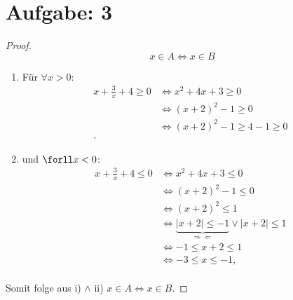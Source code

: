 \documentclass{exam}
\begin{document}
\pagebreak

\section*{Aufgabe: 3}
\begin{proof}
	\begin{displaymath}
		x \in A  \Leftrightarrow x \in B
	\end{displaymath}
	\begin{enumerate}[label=\roman*)]
		\item 	Für $\forall x > 0$: \begin{align*}
			      x + \frac{3}{x} + 4 \ge 0 & \Leftrightarrow x^2 +  4x + 3 \ge 0             \\
			                                & \Leftrightarrow {(x + 2)}^2  - 1 \ge 0          \\
			                                & \Leftrightarrow {(x + 2)}^2  - 1 \ge 4 -1 \ge 0 \\,
		      \end{align*}

		\item 	und $\forll x < 0$: \begin{align*}
			      x + \frac{3}{x} + 4 \le 0 & \Leftrightarrow x^2 +  4x + 3 \le 0                                                                   \\
			                                & \Leftrightarrow {(x + 2)}^2  - 1 \le 0                                                                \\
			                                & \Leftrightarrow {(x + 2)}^2  \le 1                                                                    \\
			                                & \Leftrightarrow \underbrace{ \mid x+2 \mid \le -1}_{\Rightarrow\Leftarrow} \lor \mid x + 2 \mid \le 1 \\
			                                & \Leftrightarrow -1 \le x + 2 \le 1                                                                    \\
			                                & \Leftrightarrow -3 \le x  \le -1,                                                                     \\
		      \end{align*}

	\end{enumerate}
	Somit folge aus i) $\land$ ii) $x \in A \Leftrightarrow x \in B$.
\end{proof}
\end{document}
